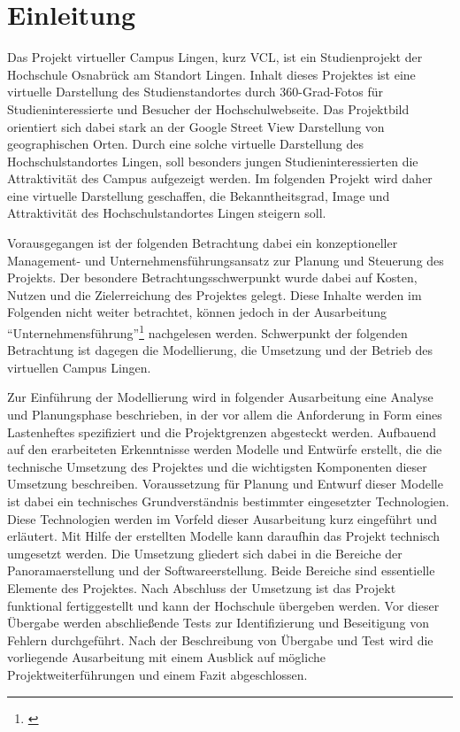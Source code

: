 \section{Einleitung}
\label{sec:Einleitung}

Das Projekt virtueller Campus Lingen, kurz VCL, ist ein Studienprojekt der
Hochschule Osnabrück am Standort Lingen. Inhalt dieses Projektes ist eine
virtuelle Darstellung des Studienstandortes durch 360-Grad-Fotos für
Studieninteressierte und Besucher der Hochschulwebseite. Das Projektbild
orientiert sich dabei stark an der Google Street View Darstellung von
geographischen Orten\footnotemark. Durch eine solche virtuelle Darstellung des
Hochschulstandortes Lingen, soll besonders jungen Studieninteressierten die
Attraktivität des Campus aufgezeigt werden. Im folgenden Projekt wird daher
eine virtuelle Darstellung geschaffen, die Bekanntheitsgrad, Image und
Attraktivität des Hochschulstandortes Lingen steigern soll.


Vorausgegangen ist der folgenden Betrachtung dabei ein konzeptioneller
Management- und Unternehmensführungsansatz zur Planung und Steuerung des
Projekts. Der besondere Betrachtungsschwerpunkt wurde dabei auf Kosten, Nutzen
und die Zielerreichung des Projektes gelegt. Diese Inhalte werden im Folgenden
nicht weiter betrachtet, können jedoch in der Ausarbeitung
"`Unternehmensführung"'\footnote{\citet{unternehmensfuehrung2014}} nachgelesen
werden. Schwerpunkt der folgenden Betrachtung ist dagegen die Modellierung, die
Umsetzung und der Betrieb des virtuellen Campus Lingen.

Zur Einführung der Modellierung wird in folgender Ausarbeitung eine Analyse und
Planungsphase beschrieben, in der vor allem die Anforderung in Form eines
Lastenheftes spezifiziert und die Projektgrenzen abgesteckt werden. Aufbauend
auf den erarbeiteten Erkenntnisse werden Modelle und Entwürfe erstellt, die
die technische Umsetzung des Projektes und die wichtigsten Komponenten dieser
Umsetzung beschreiben. Voraussetzung für Planung und Entwurf dieser Modelle
ist dabei ein technisches Grundverständnis bestimmter eingesetzter Technologien.
Diese Technologien werden im Vorfeld dieser Ausarbeitung kurz eingeführt und
erläutert. Mit Hilfe der erstellten Modelle kann daraufhin das Projekt
technisch umgesetzt werden. Die Umsetzung gliedert sich dabei in die Bereiche
der Panoramaerstellung und der Softwareerstellung. Beide Bereiche sind
essentielle Elemente des Projektes.
Nach Abschluss der Umsetzung ist das Projekt funktional fertiggestellt und kann
der Hochschule übergeben werden. Vor dieser Übergabe werden abschließende Tests
zur Identifizierung und Beseitigung von Fehlern durchgeführt.
Nach der Beschreibung von Übergabe und Test wird die vorliegende Ausarbeitung
mit einem Ausblick auf mögliche Projektweiterführungen und einem Fazit
abgeschlossen.